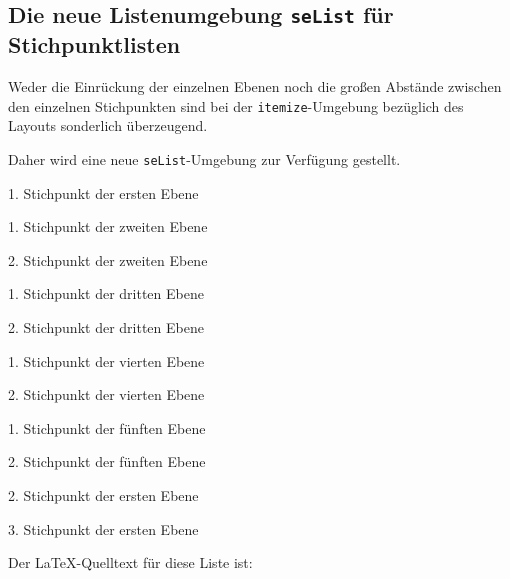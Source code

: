 \subsection{Die neue Listenumgebung \texttt{seList} f\"ur Stichpunktlisten}

Weder die Einr\"uckung der einzelnen Ebenen noch die gro{\ss}en Abst\"ande zwischen den einzelnen Stichpunkten sind bei der \verb+itemize+-Umgebung 
bez\"uglich des Layouts sonderlich \"uberzeugend. 

Daher wird eine neue \verb+seList+-Umgebung zur Verf\"ugung gestellt. 

\begin{seList}
\item 1. Stichpunkt der ersten Ebene
\begin{seList}
\item 1. Stichpunkt der zweiten Ebene
\item 2. Stichpunkt der zweiten Ebene
\begin{seList}
\item 1. Stichpunkt der dritten Ebene
\item 2. Stichpunkt der dritten Ebene
\begin{seList}
\item 1. Stichpunkt der vierten Ebene
\item 2. Stichpunkt der vierten Ebene
\begin{seList}
\item 1. Stichpunkt der f\"unften Ebene
\item 2. Stichpunkt der f\"unften Ebene
\end{seList}
\end{seList}
\end{seList}
\end{seList}
\item 2. Stichpunkt der ersten Ebene
\item 3. Stichpunkt der ersten Ebene
\end{seList}

Der \LaTeX-Quelltext f\"ur diese Liste ist: 

